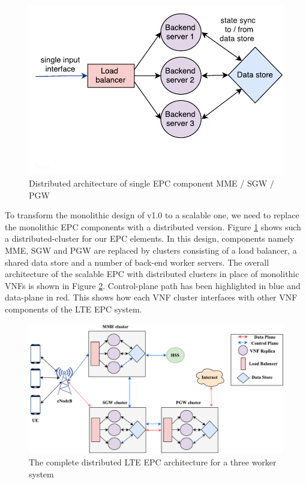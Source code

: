 \documentclass[hidelinks]{report}
\begin{document}
\begin{figure}[h]
\centering
\includegraphics[scale=0.55]{images/cluster.pdf}
\caption{Distributed architecture of single EPC component
MME / SGW / PGW}
\label{fig:singlel}
\end{figure}
To transform the monolithic design of v1.0 to a scalable one, we need to replace the monolithic EPC components with a distributed version. Figure \ref{fig:singlel} shows such a distributed-cluster for our EPC elements. In this design, components namely MME, SGW and PGW are replaced by clusters consisting of a load balancer, a shared data store and a number of back-end worker servers. The overall architecture of the scalable EPC with distributed clusters in place of monolithic VNFs is shown in Figure \ref{fig:overall}. Control-plane path has been highlighted in blue and data-plane in red. This shows how each VNF cluster interfaces with other VNF components of the LTE EPC system. 
\begin{figure}
\centering
\includegraphics[scale=0.45]{images/depc.pdf}
\caption{The complete distributed LTE EPC architecture for a three worker system}
\label{fig:overall}
\end{figure}
\end{document}
